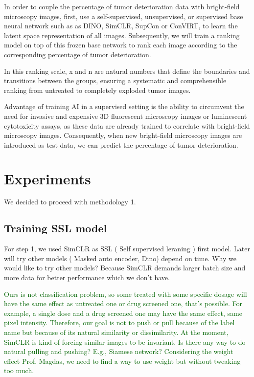 \documentclass[12pt,twoside,a4paper,parskip]{scrbook} %
\begin{document}
In order to couple the  percentage of tumor deterioration data with bright-field microscopy images, first, use a self-supervised, unsupervised, or supervised base neural network such as as DINO\cite{caron2021emerging}, SimCLR\cite{chen2020simple}, SupCon\cite{khosla2021supervised} or ConVIRT\cite{zhang2022contrastive}, to learn the latent space representation of all images. Subsequently, we will train a ranking model on top of this frozen base network to rank each image according to the corresponding percentage of tumor deterioration. 


In this ranking scale, x and n are natural numbers that define the boundaries and transitions between the groups, ensuring a systematic and comprehensible ranking from untreated to completely exploded tumor images.

Advantage of training AI in a supervised setting is the ability to circumvent the need for invasive and expensive 3D fluorescent microscopy images or luminescent cytotoxicity assays, as these data are already trained to correlate with bright-field microscopy images. Consequently, when new bright-field microscopy images are introduced as test data, we can predict the percentage of tumor deterioration.

\chapter{Experiments}\label{ch:Experiments}
We decided to proceed with methodology 1.

\section{Training SSL model}

For step 1, we used SimCLR as SSL ( Self supervised leraning ) first model. Later will try other models ( Masked auto encoder, Dino) depend on time. 
Why we would like to try other models? Because SimCLR demands larger batch size and more data for better performance which we don't have.

\textcolor{darkgreen}{Ours is not classification problem, so some treated with some specific dosage will have the same effect as untreated one or drug screened one, that's possible. For example, a single dose and a drug screened one may have the same effect, same pixel intensity. Therefore, our goal is not to push or pull because of the label name but because of its natural similarity or dissimilarity. At the moment, SimCLR is kind of forcing similar images to be invariant. Is there any way to do natural pulling and pushing? E.g., Siamese network? Considering the weight effect Prof. Magdas, we need to find a way to use weight but without tweaking too much.}
\end{document}
